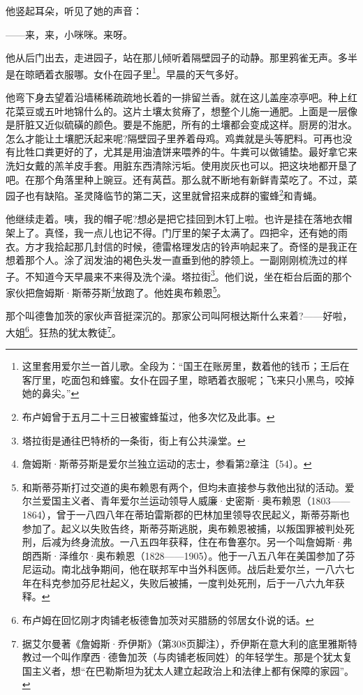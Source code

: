 \par 他竖起耳朵，听见了她的声音：
\par ——来，来，小咪咪。来呀。
\par 他从后门出去，走进园子，站在那儿倾听着隔壁园子的动静。那里鸦雀无声。多半是在晾晒着衣服哪。女仆在园子里\footnote{这里套用爱尔兰一首儿歌。全段为：“国王在账房里，数着他的钱币；王后在客厅里，吃面包和蜂蜜。女仆在园子里，晾晒着衣服呢；飞来只小黑鸟，咬掉她的鼻尖。”}。早晨的天气多好。
\par 他弯下身去望着沿墙稀稀疏疏地长着的一排留兰香。就在这儿盖座凉亭吧。种上红花菜豆或五叶地锦什么的。这片土壤太贫瘠了，想整个儿施一通肥。上面是一层像是肝脏又近似硫磺的颜色。要是不施肥，所有的土壤都会变成这样。厨房的泔水。怎么才能让土壤肥沃起来呢?隔壁园子里养着母鸡。鸡粪就是头等肥料。可再也没有比牲口粪更好的了，尤其是用油渣饼来喂养的牛。牛粪可以做铺垫。最好拿它来洗妇女戴的羔羊皮手套。用脏东西清除污垢。使用炭灰也可以。把这块地都开垦了吧。在那个角落里种上豌豆。还有莴苣。那么就不断地有新鲜青菜吃了。不过，菜园子也有缺陷。圣灵降临节的第二天，这里就曾招来成群的蜜蜂\footnote{布卢姆曾于五月二十三日被蜜蜂蜇过，他多次忆及此事。}和青蝇。
\par 他继续走着。咦，我的帽子呢?想必是把它挂回到木钉上啦。也许是挂在落地衣帽架上了。真怪，我一点儿也记不得。门厅里的架子太满了。四把伞，还有她的雨衣。方才我拾起那几封信的时候，德雷格理发店的铃声响起来了。奇怪的是我正在想着那个人。涂了润发油的褐色头发一直垂到他的脖领上。一副刚刚梳洗过的样子。不知道今天早晨来不来得及洗个澡。塔拉街\footnote{塔拉街是通往巴特桥的一条街，街上有公共澡堂。}。他们说，坐在柜台后面的那个家伙把詹姆斯·斯蒂芬斯\footnote{詹姆斯·斯蒂芬斯是爱尔兰独立运动的志士，参看第2章注〔54〕。}放跑了。他姓奥布赖恩\footnote{和斯蒂芬斯打过交道的奥布赖恩有两个，但均未直接参与救他出狱的活动。爱尔兰爱国主义者、青年爱尔兰运动领导人威廉·史密斯·奥布赖恩（1803——1864），曾于一八四八年在蒂珀雷斯郡的巴林加里领导农民起义，斯蒂芬斯也参加了。起义以失败告终，斯蒂芬斯逃脱，奥布赖恩被捕，以叛国罪被判处死刑，后减为终身流放。一八五四年获释，住在布鲁塞尔。另一个叫詹姆斯·弗朗西斯·泽维尔·奥布赖恩（1828——1905）。他于一八五八年在美国参加了芬尼运动。南北战争期间，他在联邦军中当外科医师。战后赴爱尔兰，一八六七年在科克参加芬尼社起义，失败后被捕，一度判处死刑，后于一八六九年获释。}。
\par 那个叫德鲁加茨的家伙声音挺深沉的。那家公司叫阿根达斯什么来着?——好啦，大姐\footnote{布卢姆在回忆刚才肉铺老板德鲁加茨对买腊肠的邻居女仆说的话。}。狂热的犹太教徒\footnote{据艾尔曼著《詹姆斯·乔伊斯》（第308页脚注），乔伊斯在意大利的底里雅斯特教过一个叫作摩西·德鲁加茨（与肉铺老板同姓）的年轻学生。那是个犹太复国主义者，想“在巴勒斯坦为犹太人建立起政治上和法律上都有保障的家园”。}。
